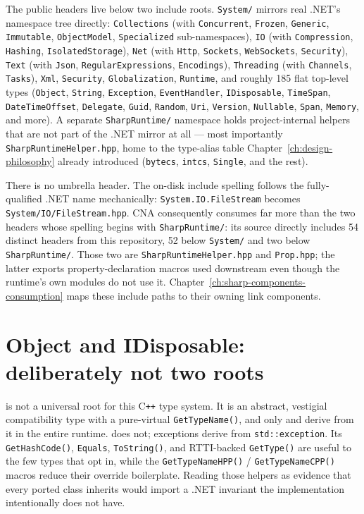 The public headers live below two include roots. \texttt{System/} mirrors real .NET's
namespace tree directly:
\texttt{Collections} (with \texttt{Concurrent}, \texttt{Frozen}, \texttt{Generic},
\texttt{Immutable}, \texttt{ObjectModel}, \texttt{Specialized} sub-namespaces),
\texttt{IO} (with \texttt{Compression}, \texttt{Hashing}, \texttt{IsolatedStorage}),
\texttt{Net} (with \texttt{Http}, \texttt{Sockets}, \texttt{WebSockets}, \texttt{Security}),
\texttt{Text} (with \texttt{Json}, \texttt{RegularExpressions}, \texttt{Encodings}),
\texttt{Threading} (with \texttt{Channels}, \texttt{Tasks}), \texttt{Xml}, \texttt{Security},
\texttt{Globalization}, \texttt{Runtime}, and roughly 185 flat top-level types
(\texttt{Object}, \texttt{String}, \texttt{Exception}, \texttt{EventHandler},
\texttt{IDisposable}, \texttt{TimeSpan}, \texttt{DateTimeOffset}, \texttt{Delegate},
\texttt{Guid}, \texttt{Random}, \texttt{Uri}, \texttt{Version}, \texttt{Nullable},
\texttt{Span}, \texttt{Memory}, and more). A separate \texttt{SharpRuntime/}
namespace holds project-internal helpers that are not part of the .NET mirror at all ---
most importantly \texttt{SharpRuntimeHelper.hpp}, home to the type-alias table
Chapter~\ref{ch:design-philosophy} already introduced (\texttt{bytecs},
\texttt{intcs}, \texttt{Single}, and the rest).

There is no umbrella header. The on-disk include spelling follows the fully-qualified .NET
name mechanically: \texttt{System.IO.FileStream} becomes
\texttt{System/IO/FileStream.hpp}. CNA consequently consumes far more than the two headers
whose spelling begins with \texttt{SharpRuntime/}: its source directly includes 54 distinct
headers from this repository, 52 below \texttt{System/} and two below \texttt{SharpRuntime/}.
Those two are \texttt{SharpRuntimeHelper.hpp} and \texttt{Prop.hpp}; the latter exports
property-declaration macros used downstream even though the runtime's own modules do not use
it. Chapter~\ref{ch:sharp-components-consumption} maps these include paths to their owning
link components.

\section{Object and IDisposable: deliberately not two roots}

 is not a universal root for this C\texttt{++} type system. It is an
abstract, vestigial compatibility type with a pure-virtual \texttt{GetTypeName()}, and only
 and  derive from it in the entire runtime.
 does not; exceptions derive from \texttt{std::exception}. Its
\texttt{GetHashCode()}, \texttt{Equals}, \texttt{ToString()}, and RTTI-backed
\texttt{GetType()} are useful to the few types that opt in, while the
\texttt{GetTypeNameHPP()} / \texttt{GetTypeNameCPP()} macros reduce their override
boilerplate. Reading those helpers as evidence that every ported class inherits
 would import a .NET invariant the implementation intentionally does not
have.

